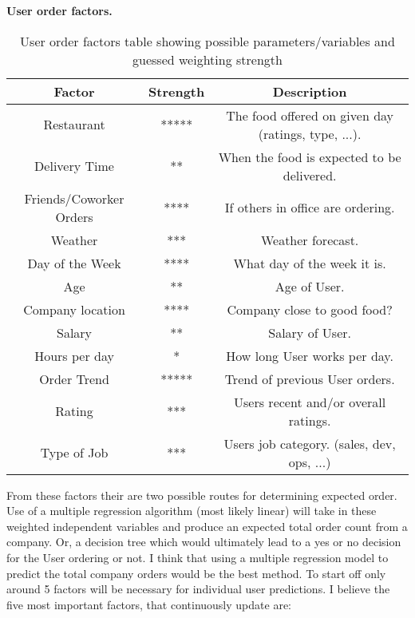 \documentclass[12pt]{article}
\begin{document}
\begin{table}[!htb]
\begin{center}
\textbf{User order factors.} \\ [1.2ex]

 \begin{tabular}{||c c c||} 
 \hline
 \textbf{Factor} & \textbf{Strength} &\textbf{Description} \\ [0.7ex] 
 \hline\hline
 Restaurant & ***** & The food offered on given day (ratings, type, ...). \\ [1ex]
 \hline
 Delivery Time & ** & When the food is expected to be delivered. \\ [1ex]
 \hline
 Friends/Coworker Orders & **** & If others in office are ordering. \\ [1ex]
 \hline
 Weather & *** & Weather forecast. \\ [1ex]
 \hline
 Day of the Week & **** & What day of the week it is. \\ [1ex]
 \hline
 Age & ** & Age of User. \\ [1ex]
\hline
 Company location & **** & Company close to good food? \\ [1ex]
\hline
Salary & ** & Salary of User. \\ [1ex]
\hline
Hours per day& * & How long User works per day. \\ [1ex]
\hline
Order Trend & ***** & Trend of previous User orders. \\ [1ex]
\hline
Rating& *** & Users recent and/or overall ratings. \\ [1ex]
\hline
Type of Job& *** & Users job category. (sales, dev, ops, ...) \\ [1ex]
\hline
\end{tabular}
\caption{User order factors table showing possible parameters/variables and guessed weighting strength}
\label{}
\end{center}
\end{table}

\vspace{0.25cm}

     From these factors their are two possible routes for determining expected order. Use of a multiple regression algorithm (most likely linear) will take in these weighted independent variables and produce an expected total order count from a company. Or, a decision tree which would ultimately lead to a yes or no decision for the User ordering or not.
     I think that using a multiple regression model to predict the total company orders would be the best method. To start off only around 5 factors will be necessary for individual user predictions. I believe the five most important factors, that continuously update are:
\end{document}
